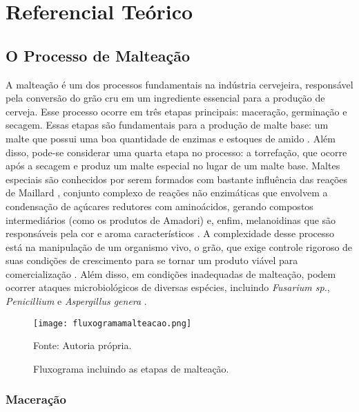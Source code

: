 \chapter[Referencial Teórico]{Referencial Teórico}

\section{O Processo de Malteação}

A malteação é um dos processos fundamentais na indústria cervejeira, responsável pela conversão do grão cru em um ingrediente essencial para a produção de cerveja. Esse processo ocorre em três etapas principais: maceração, germinação e secagem. Essas etapas são fundamentais para a produção de malte base: um malte que possui uma boa quantidade de enzimas e estoques de amido \cite{BRIGGS2004,CENCI2021}. Além disso, pode-se considerar uma quarta etapa no processo: a torrefação, que ocorre após a secagem e produz um malte especial no lugar de um malte base. Maltes especiais são conhecidos por serem formados com bastante influência das reações de Maillard \cite{COGHE2004}, conjunto complexo de reações não enzimáticas que envolvem a condensação de açúcares redutores com aminoácidos, gerando compostos intermediários (como os produtos de Amadori) e, enfim, melanoidinas que são responsáveis pela cor e aroma característicos \cite{nursten2005maillard}. A complexidade desse processo está na manipulação de um organismo vivo, o grão, que exige controle rigoroso de suas condições de crescimento para se tornar um produto viável para comercialização \cite{MALLETT2022}. Além disso, em condições inadequadas de malteação, podem ocorrer ataques microbiológicos de diversas espécies, incluindo \textit{Fusarium sp.}, \textit{Penicillium} e \textit{Aspergillus genera} \cite{LUARASI2016}.

\begin{figure}[ht]
    \centering
    \caption{Fluxograma incluindo as etapas de malteação.}
    \label{fig:fluxogramamalteacao}
    \texttt{[image: fluxogramamalteacao.png]}

    {\centering\footnotesize Fonte: Autoria própria.\par}
\end{figure}

\subsection{Maceração}

